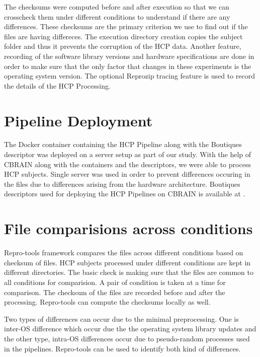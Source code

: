 The checksums were computed before and after execution so that we can crosscheck them under different conditions to understand if there are any differences. These checksums are the primary criterion we use to find out if the files are having differeces. The execution directory creation copies the subject folder and thus it prevents the corruption of the HCP data. Another feature, recording of the software library versions and hardware specifications are done in order to make sure that the only factor that changes in these experiments is the operating system version. The optional Reprozip tracing feature is used to record the details of the HCP Processing.

\section{Pipeline Deployment}
The Docker container containing the HCP Pipeline along with the Boutiques descriptor was deployed on a server setup as part of our study. With the help of CBRAIN along with the containers and the descriptors, we were able to process HCP subjects. Single server was used in order to prevent differences occuring in the files due to differences arising from the hardware architecture. Boutiques descriptors used for deploying the HCP Pipelines on CBRAIN is available at \cite{HCP_descriptors}.


\section{File comparisions across conditions}
Repro-tools framework compares the files across different conditions based on checksum of files. HCP subjects processed under different conditions are kept in different directories. The basic check is making sure that the files are common to all conditions for comparision. A pair of condition is taken at a time for comparison. The checksum of the files are recorded before and after the processing. Repro-tools can compute the checksums locally as well. 

Two types of differences can occur due to the minimal preprocessing. One is inter-OS difference which occur due the the operating system library updates and the other type, intra-OS differences occur due to pseudo-random processes used in the pipelines. Repro-tools can be used to identify both kind of differences.

